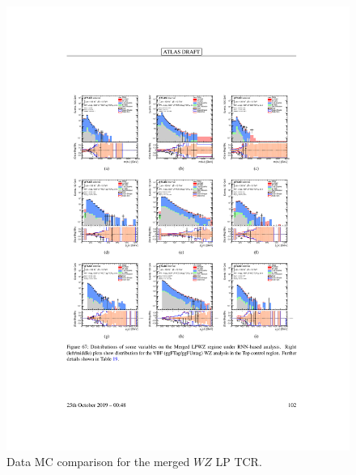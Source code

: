\begin{figure}[h!]
  \centering
  \includegraphics[width=\hsize]{figures/Analysis/datamc/merged_lp_wz_tcr.pdf}
      \caption{Data MC comparison for the merged $WZ$ LP TCR.} 
  \label{fig:merged_lp_wz_TCR_datamc}
\end{figure} 
\FloatBarrier


